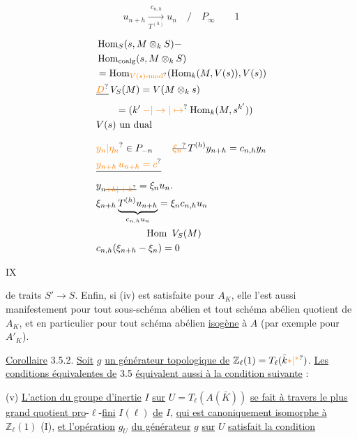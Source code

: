 \[
u_{n+h}\xrightarrow[T^{(h)}]{c_{n,h}}u_n\quad/\quad{P_\infty}
\qquad 1
\]

\[
\begin{aligned}
&\operatorname{Hom}_S(s,M\otimes_k S)\mathord{-}\\
&\operatorname{Hom}_{\mathrm{coalg}}(s,M\otimes_k S)\\
&=\operatorname{Hom}_{\unsure{V(s)\text{-mod}}}(\operatorname{Hom}_k(M,V(s)),V(s))\\
&\deleted{\unsure{D}}\,V_S(M)=V(M\otimes_k s)\\
&\qquad=(k'\mathbin{\unsure{-|\to|\mapsto}}\operatorname{Hom}_k(M,s^{k'}))\\
& V(s)\text{ un dual}
\end{aligned}
\]

\[
\begin{aligned}
&\unsure{y_n|\eta_n}\in P_{-n}\qquad \deleted{\unsure{\xi_n}}\,T^{(h)}y_{n+h}=c_{n,h}y_n\\
&\deleted{\unsure{y_{n+h}\,u_{n+h}=c}}\\
&y_{n\deleted{\unsure{+h|+k}}}=\xi_n u_n.\\
&\xi_{n+h}\underbrace{T^{(h)}u_{n+h}}_{c_{n,h}u_n}=\xi_n c_{n,h}u_n\\
&\hspace{5em}\operatorname{Hom}\ V_S(M)\\
&c_{n,h}(\xi_{n+h}-\xi_n)=0
\end{aligned}
\]

\hfill IX

de traits $S'\longrightarrow S$. Enfin, si (iv) est satisfaite pour $A_K$, elle l'est aussi manifestement pour tout sous-schéma abélien et tout schéma abélien quotient de $A_K$, et en particulier pour tout schéma abélien \uline{isogène} à $A$ (par exemple pour $A'_K$).

\uline{Corollaire} 3.5.2. \uline{Soit} $g$ \uline{un générateur topologique de} $\mathbb Z_\ell(1)=T_\ell(\bar k\unsure{\mathord{\ast}|{}^{*}})$. \uline{Les conditions équivalentes de} 3.5 \uline{équivalent aussi à la condition suivante} :

(v) \uline{L'action du groupe d'inertie} $I$ \uline{sur} $U=T_\ell(A(\bar K))$ \uline{se fait à travers le plus grand quotient pro}-$\ell$-\uline{fini} $I(\ell)$ \uline{de} $I$, \uline{qui est canoniquement isomorphe à} $\mathbb Z_\ell(1)$ (I\hspace{2.5em}), \uline{et l'opération} $g_U$ \uline{du générateur} $g$ \uline{sur} $U$ \uline{satisfait la condition}


